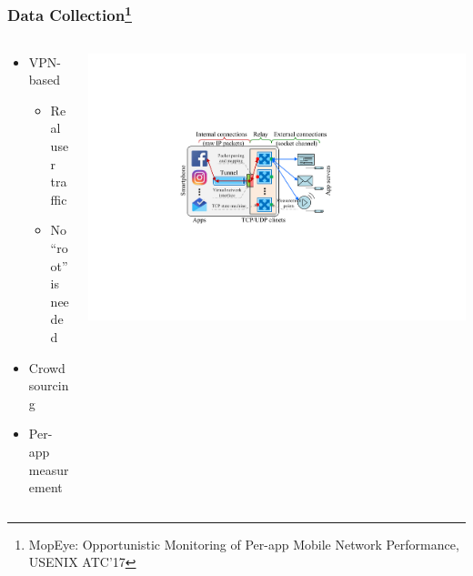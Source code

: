 \begin{frame}
    \frametitle{Data Collection\footnote{MopEye: Opportunistic Monitoring of Per-app Mobile Network Performance, USENIX ATC'17}}

    \begin{columns}
        \begin{column}{.4\textwidth}
            \begin{itemize}
                \item VPN-based
                \begin{itemize}
                    \item Real user traffic
                    \item No ``root'' is needed
                \end{itemize}
                \item Crowdsourcing
                \item Per-app measurement
            \end{itemize}
        \end{column}

        \begin{column}{.6\textwidth}
            \includegraphics[width=\textwidth]{fig/mopeye.pdf}
        \end{column}
    \end{columns}
\end{frame}



